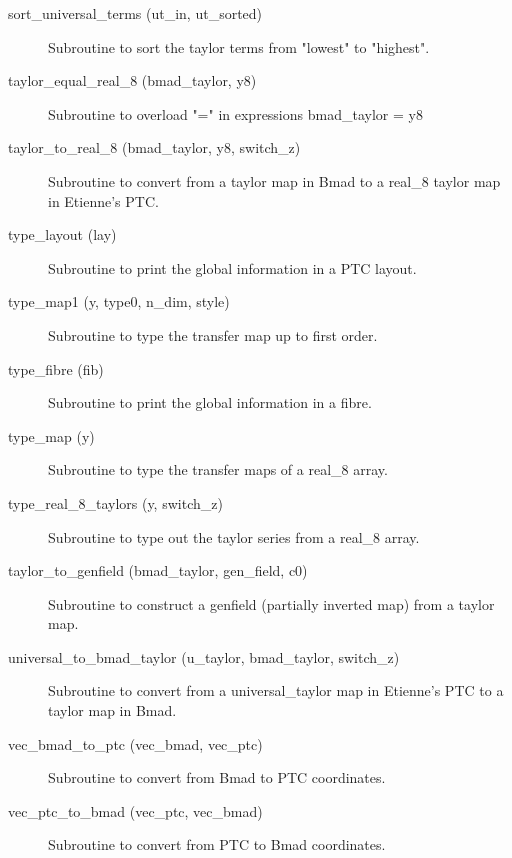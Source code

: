 \begin{description}
\item[sort_universal_terms (ut_in, ut_sorted)] \Newline
Subroutine to sort the taylor terms from "lowest" to "highest". 

\item[taylor_equal_real_8 (bmad_taylor, y8)] \Newline
Subroutine to overload "=" in expressions bmad_taylor = y8 

\item[taylor_to_real_8 (bmad_taylor, y8, switch_z)] \Newline
Subroutine to convert from a taylor map in Bmad to a real_8 taylor map in Etienne's PTC. 

\item[type_layout (lay)] \Newline
Subroutine to print the global information in a PTC layout.

\item[type_map1 (y, type0, n_dim, style)] \Newline
Subroutine to type the transfer map up to first order. 

\item[type_fibre (fib)] \Newline
Subroutine to print the global information in a fibre.

\item[type_map (y)] \Newline
Subroutine to type the transfer maps of a real_8 array. 

\item[type_real_8_taylors (y, switch_z)] \Newline
Subroutine to type out the taylor series from a real_8 array. 

\item[taylor_to_genfield (bmad_taylor, gen_field, c0)] \Newline
Subroutine to construct a genfield (partially inverted map) from a taylor map. 

\item[universal_to_bmad_taylor (u_taylor, bmad_taylor, switch_z)] \Newline
Subroutine to convert from a universal_taylor map in Etienne's PTC to a taylor map in Bmad. 

\item[vec_bmad_to_ptc (vec_bmad, vec_ptc)] \Newline
Subroutine to convert from Bmad to PTC coordinates. 

\item[vec_ptc_to_bmad (vec_ptc, vec_bmad)] \Newline
Subroutine to convert from PTC to Bmad coordinates. 

\end{description}

